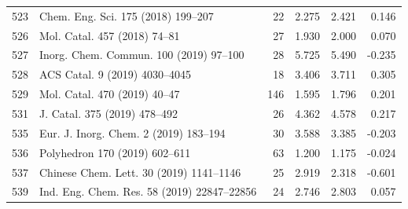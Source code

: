 \begin{longtable}{r p{.39\linewidth} rrrr}
523 & Chem. Eng. Sci. 175 (2018) 199--207 & 22 & 2.275 & 2.421 & 0.146 \\
526 & Mol. Catal. 457 (2018) 74--81  & 27 & 1.930 & 2.000 & 0.070 \\
527 & Inorg. Chem. Commun. 100 (2019) 97--100 & 28 & 5.725 & 5.490 & -0.235 \\
528 & ACS Catal. 9 (2019) 4030--4045 & 18 & 3.406 & 3.711 & 0.305 \\
529 & Mol. Catal. 470 (2019) 40--47 & 146 & 1.595 & 1.796 & 0.201 \\
531 & J. Catal. 375 (2019) 478--492 & 26 & 4.362 & 4.578 & 0.217 \\
535 & Eur. J. Inorg. Chem. 2 (2019) 183--194 & 30 & 3.588 & 3.385 & -0.203 \\
536 & Polyhedron 170 (2019) 602--611 & 63 & 1.200 & 1.175 & -0.024 \\
537 & Chinese Chem. Lett. 30 (2019) 1141--1146 & 25 & 2.919 & 2.318 & -0.601 \\
539 & Ind. Eng. Chem. Res. 58 (2019) 22847--22856 & 24 & 2.746 & 2.803 & 0.057 \\
\end{longtable}\normalsize